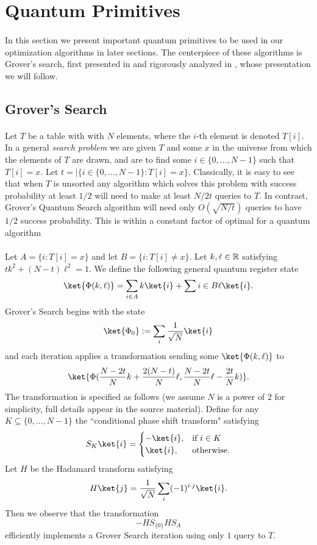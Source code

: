 \section{Quantum Primitives}\label{sec:quantum-primitives}
\paragraph{}
In this section we present important quantum primitives to be used in our optimization algorithms in later sections. The centerpiece of these algorithms is Grover's search, first presented in \cite{grover1996fast} and rigorously analyzed in \cite{boyer1996tight}, whose presentation we will follow.
\subsection{Grover's Search}
\paragraph{}
Let $T$ be  a table with with $N$ elements, where the $i$-th element is denoted $T[i]$. In a general {\it search problem} we are given $T$ and some $x$ in the universe from which the elements of $T$ are drawn, and are to find some $i \in \{0, \dots, N-1\}$ such that $T[i] = x$. Let $t= |\{ i \in \{0,\dots, N-1\} : T[i] = x\}$. Classically, it is easy to see that when $T$ is unsorted any algorithm which solves this problem with success probability at least $1/2$ will need to make at least $N/2t$ queries to $T$. In contrast, Grover's Quantum Search algorithm will need only $O(\sqrt{N/t})$ queries to have $1/2$ success probability. This is within a constant factor of optimal for a quantum algorithm 
\paragraph{}
Let $A = \{ i : T[i] = x\}$ and let $B = \{ i : T[i] \neq x \}$. Let $k, \ell \in \mathbb{R}$ satisfying $tk^2 + (N-t)\ell^2 = 1$.  We define the following general quantum register state
$$\ket{\Phi(k,\ell)} = \sum_{i \in A} k \ket{i} + \sum{i \in B} \ell \ket{i}.$$
Grover's Search begins with the state $$\ket{\Phi_0} := \sum_i \frac{1}{\sqrt{N}} \ket{i}$$
and each iteration applies a transformation sending some $\ket{\Phi(k,\ell)}$ to
$$\ket{\Phi(\frac{N-2t}{N}k + \frac{2(N-t)}{N}\ell, \frac{N-2t}{N}\ell - \frac{2t}{N} k)}.$$
The transformation is specified as follows (we assume $N$ is a power of $2$ for simplicity, full details appear in the source material). Define for any $K \subseteq \{0, \dots, N-1\}$ the ``conditional phase shift transform" satisfying
$$S_K\ket{i} = \begin{cases}
-\ket{i}, &\text{if $i \in K$} \\
\ket{i}, &\text{otherwise}.
\end{cases}$$
Let $H$ be the Hadamard transform satisfying
$$H\ket{j} = \frac{1}{\sqrt{N}} \sum_i (-1)^{i\cdot j} \ket{i}.$$
Then we observe that the transformation
$$-HS_{\{0\}}HS_A$$
efficiently implements a Grover Search iteration using only $1$ query to $T$.

